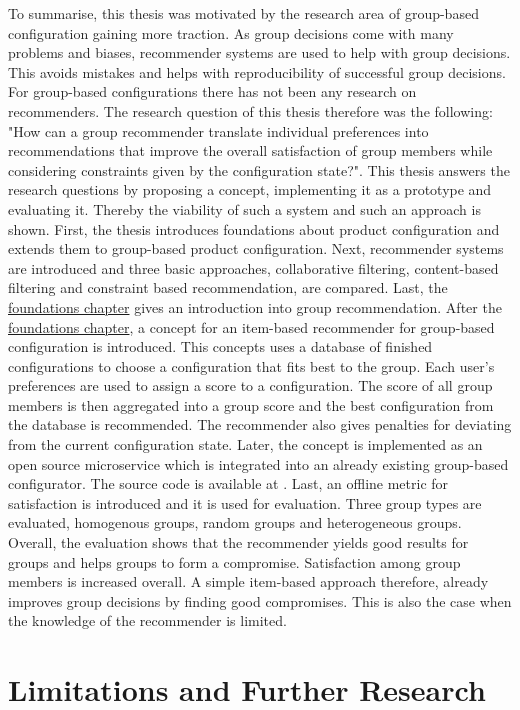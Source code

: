 To summarise, this thesis was motivated by the research area of group-based configuration gaining more traction. As group decisions come with many problems and biases, recommender systems are used  to help with group decisions. This avoids mistakes and helps with reproducibility of successful group decisions. For group-based configurations there has not been any research on recommenders. The research question of this thesis therefore was the following: "How can a group recommender translate individual preferences into recommendations that improve the overall satisfaction of group members while considering constraints given by the configuration state?". This thesis answers the research questions by proposing a concept, implementing it as a prototype and evaluating it. Thereby the viability of such a system and such an approach is shown.
First, the thesis introduces foundations about product configuration and extends them to group-based product configuration. Next, recommender systems are introduced and three basic approaches, collaborative filtering, content-based filtering and constraint based recommendation, are compared. Last, the \hyperref[ch:Foundations]{foundations chapter} gives an introduction into group recommendation.
After the \hyperref[ch:Foundations]{foundations chapter}, a concept for an item-based recommender for group-based configuration is introduced. This concepts uses a database of finished configurations to choose a configuration that fits best to the group. Each user's preferences are used to assign a score to a configuration. The score of all group members is then aggregated into a group score and the best configuration from the database is recommended. The recommender also gives penalties for deviating from the current configuration state.
Later, the concept is implemented as an open source microservice which is integrated into an already existing group-based configurator. The source code is available at \cite{kuchelmeister13hannes11BachelorThesis}.
Last, an offline metric for satisfaction is introduced and it is used for evaluation. Three group types are evaluated, homogenous groups, random groups and heterogeneous groups. Overall, the evaluation shows that the recommender yields good results for groups and helps groups to form a compromise. Satisfaction among group members is increased overall. A simple item-based approach therefore,  already improves group decisions by finding good compromises. This is also the case when the knowledge of the recommender is limited.

\section{Limitations and Further Research}
\label{sec:Conclusion:LimitationsFurtherResearch}

